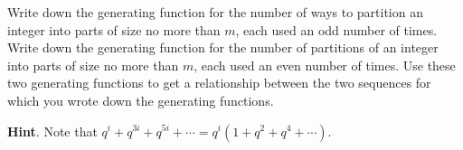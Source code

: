 \documentclass{book}
\begin{document}
\setcounter{cpjt}{326}
\addtocounter{cpjt}{-1}
\begin{activity}\label{activity-319}
\hypertarget{p-1610}{}%
Write down the generating function for the number of ways to partition an integer into parts of size no more than \(m\), each used an odd number of times. Write down the generating function for the number of partitions of an integer into parts of size no more than \(m\), each used an even number of times. Use these two generating functions to get a relationship between the two sequences for which you wrote down the generating functions.%
\par\smallskip%
\noindent\textbf{Hint}.\hypertarget{hint-216}{}\quad%
\hypertarget{p-1611}{}%
Note that \(q^i + q^{3i} + q^{5i} + \cdots = q^i (1 + q^2 + q^4 + \cdots)\).%
\par\smallskip%
\noindent\end{activity}

\clearpage
\end{document}
